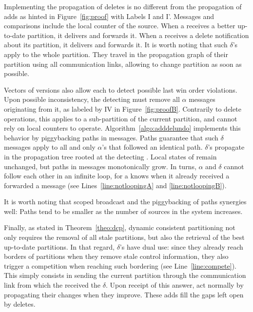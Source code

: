 Implementing the propagation of deletes is no different from the
propagation of adds as hinted in Figure~\ref{fig:proof} with Labels I
and I'. Messages and comparisons include the local counter of the
source. When a \process receives a better up-to-date partition, it
delivers and forwards it. When a \process receives a delete
notification about its partition, it delivers and forwards it. It is
worth noting that such $\delta$'s apply to the whole partition. They
travel in the propagation graph of their partition using all
communication links, allowing \processes to change partition as soon as
possible.

Vectors of versions also allow each \process to detect possible last
win order violations. Upon possible inconsistency, the detecting
\process must remove all $\alpha$ messages originating from it, as
labeled by IV in Figure~\ref{fig:proofB}. Contrarily to delete
operations, this applies to a sub-partition of the current partition,
and cannot rely on local counters to
operate. Algorithm~\ref{algo:adddelundo} implements this behavior by
piggybacking paths in messages. Paths guarantee that such $\delta$
messages apply to all and only $\alpha$'s that followed an identical
path. $\delta$'s propagate in the propagation tree rooted at the
detecting \process. Local states of \processes remain unchanged, but
paths in messages monotonically grow. In turns, $\alpha$ and $\delta$
cannot follow each other in an infinite loop, for a \process knows when
it already received a forwarded a message (see
Lines~\ref{line:notloopingA} and \ref{line:notloopingB}).

\noindent It is worth noting that scoped broadcast and the
piggybacking of paths synergies well: Paths tend to be smaller as the
number of sources in the system increases.

Finally, as stated in Theorem~\ref{theo:dcp}, dynamic consistent
partitioning not only requires the removal of all stale partitions,
but also the retrieval of the best up-to-date partitions. In that
regard, $\delta$'s have dual use: since they already reach borders of
partitions when they remove stale control information, they also
trigger a competition when reaching such bordering \processes (see
Line~\ref{line:compete}). This simply consists in sending the current
partition through the communication link from which the \process
received the $\delta$. Upon receipt of this answer, \processes act
normally by propagating their changes when they improve. These adds
fill the gaps left open by deletes.

